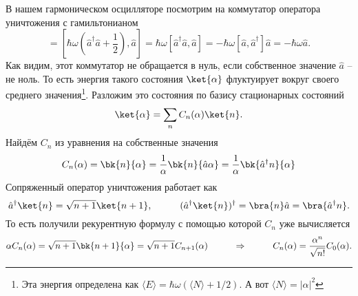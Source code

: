 В нашем гармоническом осцилляторе посмотрим на коммутатор оператора уничтожения с гамильтонианом
\begin{equation*}
	[\hat{H}, \hat{a}]
	= 
	[\hbar \omega \left(\hat{a}^\dagger \hat{a} + \frac{1}{2}\right) , \hat{a}]
	=
	\hbar \omega [\hat{a}^\dagger \hat{a}, \hat{a}] = - \hbar \omega [ \hat{a}, \hat{a}^\dagger] \hat{a} = - \hbar \omega \hat{a}.
\end{equation*}
Как видим, этот коммутатор не обращается в нуль, если собственное значение $\hat{a}$ -- не ноль. То есть энергия такого состояния $\ket{\alpha}$ флуктуирует вокруг своего среднего значения\footnote{Эта энергия определена как
$\langle E \rangle = \hbar \omega (\langle N \rangle + 1/2).$ А вот $\langle N \rangle = |\alpha|^2$}. Разложим это состояния по базису стационарных состояний
\begin{equation*}
	\ket{\alpha} = \sum_n C_n (\alpha) \ket{n}.
\end{equation*}
Найдём $C_n$ из уравнения на собственные значения
\begin{equation*}
	C_n(\alpha) = \bk{n}{\alpha} = \frac{1}{\alpha}\bk{n}{\hat{a} \alpha} = \frac{1}{\alpha} \bk{\hat{a}^\dagger n}{\alpha}
\end{equation*}
Сопряженный оператор уничтожения работает как
\begin{equation*}
	\hat{a}^\dagger \ket{n} = \sqrt{n+1} \ket{n+1}, 
	\hspace{1 cm}
	(\hat{a}^\dagger \ket{n})^\dagger = \bra{n} \hat{a} = \bra{\hat{a}^\dagger n}.
\end{equation*}
То есть получили рекурентную формулу с помощью которой $C_n$ уже вычисляется
\begin{equation*}
	\alpha C_n(\alpha) = \sqrt{n+1} \bk{n+1}{\alpha} = \sqrt{n+1} C_{n+1}(\alpha)
	\hspace{1 cm}
	\Rightarrow
	\hspace{1 cm}
	C_n(\alpha) = \frac{\alpha^n}{\sqrt{n!}} C_0(\alpha).
\end{equation*}

